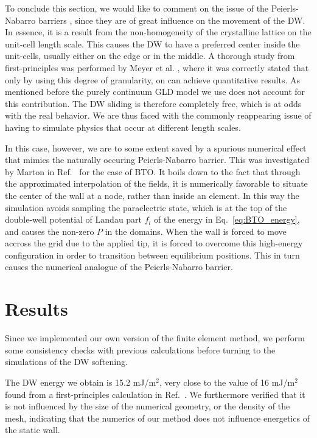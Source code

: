 To conclude this section, we would like to comment on the issue of the Peierls-Nabarro barriers \cite{Peierls1940,Nabarro1947}, since they are of great influence on the movement of the DW.
In essence, it is a result from the non-homogeneity of the crystalline lattice on the unit-cell length scale.
This causes the DW to have a preferred center inside the unit-cells, usually either on the edge or in the middle.
A thorough study from first-principles was performed by Meyer et al. \cite{Meyer2002}, where it was correctly stated that only by using this degree of granularity, on can achieve quantitative results.
As mentioned before the purely continuum GLD model we use does not account for this contribution.
The DW sliding is therefore completely free, which is at odds with the real behavior.
We are thus faced with the commonly reappearing issue of having to simulate physics that occur at different length scales.

In this case, however, we are to some extent saved by a spurious numerical effect that mimics the naturally occuring Peierls-Nabarro barrier.
This was investigated by Marton in Ref.~\cite{Marton2018} for the case of BTO.
It boils down to the fact that through the approximated interpolation of the fields, it is numerically favorable to situate the center of the wall at a node, rather than inside an element.
In this way the simulation avoids sampling the paraelectric state, which is at the top of the double-well potential of Landau part $f_l$ of the energy in Eq.~\ref{eq:BTO_energy}, and causes the non-zero $P$ in the domains.
When the wall is forced to move accross the grid due to the applied tip, it is forced to overcome this high-energy configuration in order to transition between equilibrium positions.
This in turn causes the numerical analogue of the Peierls-Nabarro barrier.

\section{Results}
Since we implemented our own version of the finite element method, we perform some consistency checks with previous calculations before turning to the simulations of the DW softening.

The DW energy we obtain is 15.2 mJ/m$^2$, very close to the value of 16 mJ/m$^2$ found from a first-principles calculation in Ref.~\cite{Padilla1996}.
We furthermore verified that it is not influenced by the size of the numerical geometry, or the density of the mesh, indicating that the numerics of our method does not influence energetics of the static wall.

